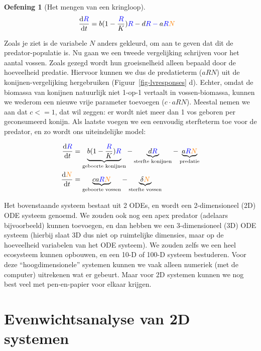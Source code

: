 \documentclass[
  a4paper,
]{scrbook}
\theoremstyle{definition}
\newtheorem{exercise}{Oefening}[chapter]
\theoremstyle{remark}
\begin{document}
\begin{exercise}[Het mengen van een
kringloop]
\begin{align*}
  \color{black}\frac{\mathrm{d}\color{blue}R}{\mathrm{d}t} &\color{black}= b(1-\frac{\color{blue}R}{K})\color{blue}R\color{black} - d\color{blue}R - \color{black}a\color{blue}R\color{orange}N
\end{align*}

Zoals je ziet is de variabele \(N\) anders gekleurd, om aan te geven dat
dit de {predator}-populatie is. Nu gaan we een tweede vergelijking
schrijven voor het aantal vossen. Zoals gezegd wordt hun groeisnelheid
alleen bepaald door de hoeveelheid predatie. Hiervoor kunnen we dus de
predatieterm (\(aRN\)) uit de konijnen-vergelijking hergebruiken
(Figuur~\ref{fig-lvresponses} d). Echter, omdat de biomassa van konijnen
natuurlijk niet 1-op-1 vertaalt in vossen-biomassa, kunnen we wederom
een nieuwe vrije parameter toevoegen (\(c \cdot aRN\)). Meestal nemen we
aan dat \(c<=1\), dat wil zeggen: er wordt niet meer dan 1 vos geboren
per geconsumeerd konijn. Als laatste voegen we een eenvoudig sterfteterm
toe voor de predator, en zo wordt ons uiteindelijke model:

\begin{align*}
    \color{black}\frac{\mathrm{d}\color{blue}R}{\mathrm{d}t} &\color{black}= \underbrace{b(1-\frac{\color{blue}R}{K})\color{blue}R\color{black}}_{\text{geboorte konijnen}} - 
\underbrace{d\color{blue}R}_{\text{sterfte konijnen}} - \underbrace{\color{black}a\color{blue}R\color{orange}N\color{black}}_{\text{predatie}}\\
\color{black}\frac{\mathrm{d}\color{orange}N}{\mathrm{d}t} &\color{black}= \underbrace{\color{black}ca\color{blue}R\color{orange}N\color{black}}_{\text{geboorte vossen}}\color{black} - \underbrace{\delta \color{orange}N\color{black}}_{\text{sterfte vossen}}
\end{align*}

Het bovenstaande systeem bestaat uit 2 ODEs, en wordt een 2-dimensioneel
(2D) ODE systeem genoemd. We zouden ook nog een apex predator (adelaars
bijvoorbeeld) kunnen toevoegen, en dan hebben we een 3-dimensioneel (3D)
ODE systeem (hierbij slaat 3D dus niet op ruimtelijke dimensies, maar op
de hoeveelheid variabelen van het ODE systeem). We zouden zelfs we een
heel ecosysteem kunnen opbouwen, en een 10-D of 100-D systeem
bestuderen. Voor deze ``hoogdimensionele'' systemen kunnen we vaak
alleen numeriek (met de computer) uitrekenen wat er gebeurt. Maar voor
2D systemen kunnen we nog best veel met pen-en-papier voor elkaar
krijgen.

\section{Evenwichtsanalyse van 2D
systemen}\label{evenwichtsanalyse-van-2d-systemen}


\end{exercise}
\end{document}

